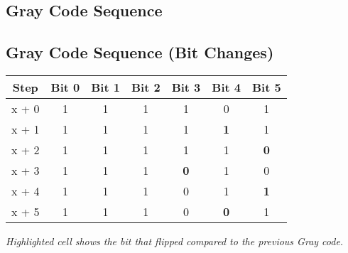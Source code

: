 \subsection*{Gray Code Sequence}
\subsection*{Gray Code Sequence (Bit Changes)}

\begin{tabular}{|c|*6{c|}}
\hline
Step &  Bit 0 &  Bit 1 &  Bit 2 &  Bit 3 &  Bit 4 &  Bit 5   \\
\hline
x + 0 &
    1
&    1
&    1
&    1
&    0
&    1
 \\
\hline
x + 1 &
    1
&    1
&    1
&    1
&    \cellcolor{yellow}\textbf{ 1 }
&    1
 \\
\hline
x + 2 &
    1
&    1
&    1
&    1
&    1
&    \cellcolor{yellow}\textbf{ 0 }
 \\
\hline
x + 3 &
    1
&    1
&    1
&    \cellcolor{yellow}\textbf{ 0 }
&    1
&    0
 \\
\hline
x + 4 &
    1
&    1
&    1
&    0
&    1
&    \cellcolor{yellow}\textbf{ 1 }
 \\
\hline
x + 5 &
    1
&    1
&    1
&    0
&    \cellcolor{yellow}\textbf{ 0 }
&    1
 \\
\hline
\end{tabular}

\emph{Highlighted cell shows the bit that flipped compared to the previous Gray code.}



\pagebreak